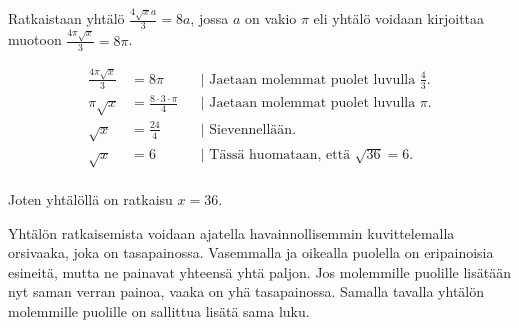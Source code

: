 \begin{esimerkki}
Ratkaistaan yhtälö $\frac{4\sqrt{x}a}{3}=8a$, jossa $a$ on vakio $\pi$ eli yhtälö voidaan kirjoittaa muotoon $\frac{4\pi\sqrt{x}}{3}=8\pi$.

		\begin{align*}
			\frac{4 \pi \sqrt{x}}{3} &= 8 {\pi} && \text{| Jaetaan molemmat puolet luvulla $\frac{4}{3}$.} \\
			{\pi}\sqrt{x} &= \frac{8\cdot 3\cdot {\pi}}{4} && \text{| Jaetaan molemmat puolet luvulla $\pi$.} \\
			\sqrt{x} &= \frac{24}{4} && \text{| Sievennellään.} \\
			\sqrt{x} &= 6 && \text{| Tässä huomataan, että $\sqrt{36}=6$.} \\
\end{align*}

Joten yhtälöllä on ratkaisu $x=36$.

\end{esimerkki}

Yhtälön ratkaisemista voidaan ajatella havainnollisemmin kuvittelemalla orsivaaka, joka on tasapainossa. Vasemmalla ja oikealla puolella on eripainoisia esineitä, mutta ne painavat yhteensä yhtä paljon. Jos molemmille puolille lisätään nyt saman verran painoa, vaaka on yhä tasapainossa. Samalla tavalla yhtälön molemmille puolille on sallittua lisätä sama luku.

